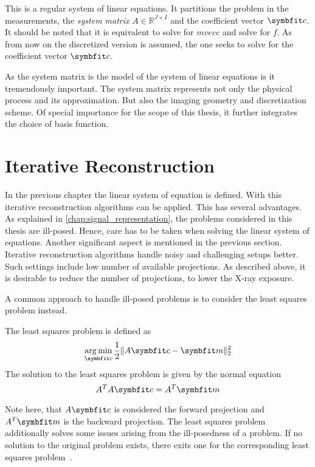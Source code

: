 This is a regular system of linear equations. It partitions the problem in the measurements, the
\textit{system matrix} \(A \in \mathbb{R}^{J \times I}\) and the coefficient vector \(\mvec{c}\). It
should be noted that it is equivalent to solve for \(mvec{c}\) and solve for \(f\). As from now on
the discretized version is assumed, the one seeks to solve for the coefficient vector \(\mvec{c}\).

As the system matrix is the model of the system of linear equations is it tremendously important.
The system matrix represents not only the physical process and its approximation. But also the
imaging geometry and discretization scheme. Of special importance for the scope of this thesis, it
further integrates the choice of basis function.

\section{Iterative Reconstruction}\label{sec:iterative_reconstruction}

In the previous chapter the linear system of equation is defined. With this iterative reconstruction
algorithms can be applied. This has several advantages. As explained in
\autoref{chap:signal_representation}, the problems considered in this thesis are ill-posed. Hence,
care has to be taken when solving the linear system of equations. Another significant aspect is
mentioned in the previous section. Iterative reconstruction algorithms handle noisy and challenging
setups better. Such settings include low number of available projections. As described above, it is
desirable to reduce the number of projections, to lower the X-ray exposure.

A common approach to handle ill-posed problems is to consider the least squares problem instead.
\begin{definition}\label{def:least_squares_problem}
	The least squares problem is defined as
	\[ \argmin_{\mvec{c}} \frac{1}{2} \norm{A\mvec{c} - \mvec{m}}^2_2 \]
	The solution to the least squares problem is given by the normal equation
	\[ A^T A \mvec{c} = A^T \mvec{m} \]
\end{definition}
Note here, that \(A\mvec{c}\) is considered the forward projection and \(A^T \mvec{m}\) is the
backward projection. The least squares problem additionally solves some issues arising from the
ill-posedness of a problem. If no solution to the original problem exists, there exits one for the
corresponding least squares problem~\cite{hansen_discrete_2010}.

